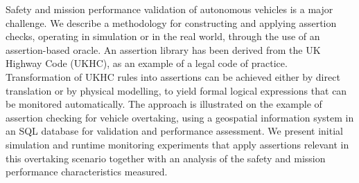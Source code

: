 Safety and mission performance validation of autonomous vehicles is a major challenge. We describe a methodology for constructing and applying assertion checks, operating in simulation or in the real world, through the use of an assertion-based oracle. 
%
An assertion library has been derived from the UK Highway Code (UKHC), as an example of a legal code of practice. 
%
Transformation of UKHC rules into assertions can be achieved either by direct translation or by physical modelling, to yield formal logical expressions that can be monitored automatically.
%
The approach is illustrated on the example of assertion checking for vehicle overtaking, using a geospatial information system in an SQL database for validation and performance assessment.
%
We present initial simulation and runtime monitoring 
experiments that apply assertions relevant in this overtaking scenario together with an analysis of the safety and mission performance characteristics measured.
%
